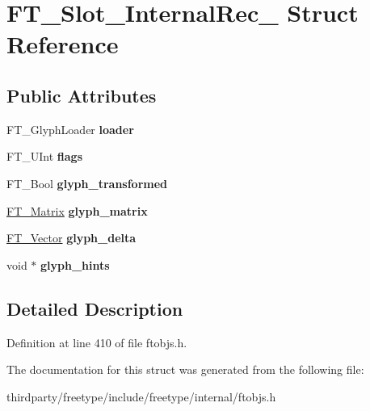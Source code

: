 \hypertarget{struct_f_t___slot___internal_rec__}{}\section{F\+T\+\_\+\+Slot\+\_\+\+Internal\+Rec\+\_\+ Struct Reference}
\label{struct_f_t___slot___internal_rec__}
\subsection*{Public Attributes}
\begin{DoxyCompactItemize}
\item 
\mbox{\label{struct_f_t___slot___internal_rec___ac57f8c939f667938ab9f986088c15d8f}} 
F\+T\+\_\+\+Glyph\+Loader {\bfseries loader}
\item 
\mbox{\label{struct_f_t___slot___internal_rec___a9a2a287ba2b363197b36fe24d2f48746}} 
F\+T\+\_\+\+U\+Int {\bfseries flags}
\item 
\mbox{\label{struct_f_t___slot___internal_rec___ac2bba891ac70016b74c085a05c1f182c}} 
F\+T\+\_\+\+Bool {\bfseries glyph\+\_\+transformed}
\item 
\mbox{\label{struct_f_t___slot___internal_rec___a95af217daf1c2080692b5a69e345aa3b}} 
\hyperlink{struct_f_t___matrix__}{F\+T\+\_\+\+Matrix} {\bfseries glyph\+\_\+matrix}
\item 
\mbox{\label{struct_f_t___slot___internal_rec___a2a94b955dd1e260aaf8699238d44769d}} 
\hyperlink{struct_f_t___vector__}{F\+T\+\_\+\+Vector} {\bfseries glyph\+\_\+delta}
\item 
\mbox{\label{struct_f_t___slot___internal_rec___a16337853823cdccfb0c636673c4eb3ae}} 
void $\ast$ {\bfseries glyph\+\_\+hints}
\end{DoxyCompactItemize}


\subsection{Detailed Description}


Definition at line 410 of file ftobjs.\+h.



The documentation for this struct was generated from the following file\+:\begin{DoxyCompactItemize}
\item 
thirdparty/freetype/include/freetype/internal/ftobjs.\+h\end{DoxyCompactItemize}

